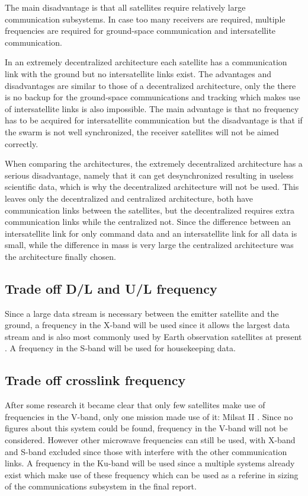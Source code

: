 The main disadvantage is that all satellites require relatively large communication subsystems. In case too many receivers are required, multiple frequencies are required for ground-space communication and intersatellite communication.

In an extremely decentralized architecture each satellite has a communication link with the ground but no intersatellite links exist.
The advantages and disadvantages are similar to those of a decentralized architecture, only the there is no backup for the ground-space communications and tracking which makes use of intersatellite links is also impossible.
The main advantage is that no frequency has to be acquired for intersatellite communication but the disadvantage is that if the swarm is not well synchronized, the receiver satellites will not be aimed correctly.

When comparing the architectures, the extremely decentralized architecture has a serious disadvantage, namely that it can get desynchronized resulting in useless scientific data, which is why the decentralized architecture will not be used.
This leaves only the decentralized and centralized architecture, both have communication links between the satellites, but the decentralized requires extra communication links while the centralized not. Since the difference between an intersatellite link for only command data and an intersatellite link for all data is small, while the difference in mass is very large the centralized architecture was the architecture finally chosen.

\subsection{Trade off D/L and U/L frequency}
Since a large data stream is necessary between the emitter satellite and the ground, a frequency in the X-band will be used since it allows the largest data stream and is also most commonly used by Earth observation satellites at present \cite{icesattech} \cite{landsatcom}. A frequency in the S-band will be used for housekeeping data.

\subsection{Trade off crosslink frequency}
After some research it became clear that only few satellites make use of frequencies in the V-band, only one mission made use of it: Milsat II \cite{milstar}. Since no figures about this system could be found, frequency in the V-band will not be considered.
However other microwave frequencies can still be used, with X-band and S-band excluded since those with interfere with the other communication links. A frequency in the Ku-band will be used since a multiple systems already exist which make use of these frequency which can be used as a referine in sizing of the communications subsystem in the final report.

